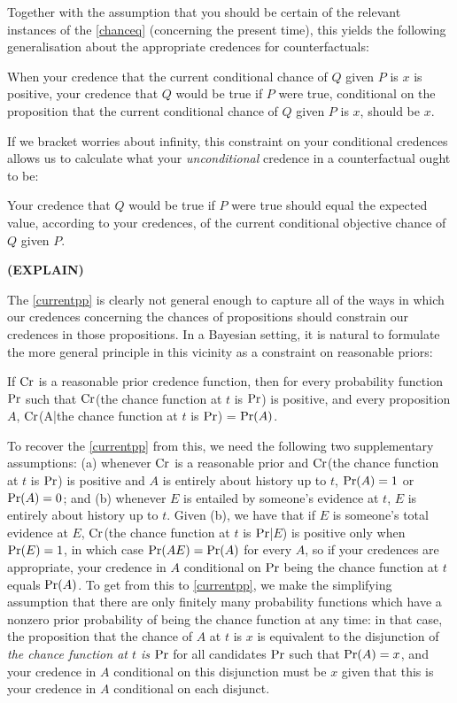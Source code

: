 \documentclass[If.tex]{subfiles}
\begin{document}
Together with the assumption that you should be certain of the relevant
instances of the \ref{chanceq} (concerning the present time), this
yields the following generalisation about the appropriate credences for
counterfactuals:
\begin{prop}
	 \label{currentskyrms}
	When your credence that the current conditional chance of $Q$ given $P$ is $x$ is positive, your credence that $Q$ would be true if $P$ were true, conditional on the proposition that the current conditional chance of $Q$ given $P$ is $x$, should be $x$. 
\end{prop}
If we bracket worries about infinity, this constraint on your
conditional credences allows us to calculate what your
\emph{unconditional} credence in a counterfactual ought to be:
\begin{prop}
	\item
	Your credence that $Q$ would be true if $P$ were true should equal the expected value, according to your credences, of the current conditional objective chance of $Q$ given $P$.
\end{prop}
\textbf{(EXPLAIN)}

The \ref{currentpp} is clearly not general enough to capture all of the ways in which our credences concerning the chances of propositions should constrain our credences in those propositions.  In a Bayesian setting, it is natural to formulate the more general principle in this vicinity as a constraint on reasonable priors:  
\begin{prop}
	 \label{pp}
	If $\operatorname{Cr}$ is a reasonable prior credence function, then for every probability function $\operatorname{Pr}$ such that $\operatorname{Cr}$(the chance function at $t$ is $\operatorname{Pr}$) is positive, and every proposition $A$, $\operatorname{Cr}$(A|the chance function at $t$ is $\operatorname{Pr}$) = $\operatorname{Pr}(A)$.  
\end{prop}
To recover the \ref{currentpp} from this, we need the following two supplementary assumptions: (a) whenever $\operatorname{Cr}$ is a reasonable prior and $\operatorname{Cr}$(the chance function at $t$ is $\operatorname{Pr}$) is positive and $A$ is entirely about history up to $t$, $\operatorname{Pr}(A) = 1$ or $\operatorname{Pr}(A) = 0$; and (b) whenever $E$ is entailed by someone's evidence at $t$, $E$ is entirely about history up to $t$.  Given (b), we have that if $E$ is someone's total evidence at $E$, $\operatorname{Cr}$(the chance function at $t$ is $\operatorname{Pr}$|$E$) is positive only when $\operatorname{Pr}(E) = 1$, in which case $\operatorname{Pr}(AE) = \operatorname{Pr}(A)$ for every $A$, so if your credences are appropriate, your credence in $A$ conditional on $\operatorname{Pr}$ being the chance function at $t$ equals $\operatorname{Pr}(A)$. To get from this to \ref{currentpp}, we make the simplifying assumption that there are only finitely many probability functions which have a nonzero prior probability of being the chance function at any time: in that case, the proposition that the chance of $A$ at $t$ is $x$ is equivalent to the disjunction of \emph{the chance function at $t$ is $\operatorname{Pr}$} for all candidates $\operatorname{Pr}$ such that $\operatorname{Pr}(A) = x$, and your credence in $A$ conditional on this disjunction must be $x$ given that this is your credence in $A$ conditional on each disjunct.  
\end{document}
